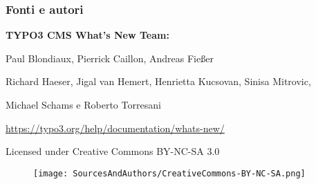 
\begin{frame}[fragile]
	\frametitle{Fonti e autori}

	\vspace{-0.6cm}

	\centerline{\textbf{TYPO3 CMS What's New Team:}}

	\begin{center}
		\centerline{Paul Blondiaux, Pierrick Caillon, Andreas Fießer}
		\centerline{Richard Haeser, Jigal van Hemert, Henrietta Kucsovan, Sinisa Mitrovic,}
		\centerline{Michael Schams e Roberto Torresani}
	\end{center}

	\vspace{0.6cm}

	\smaller\begin{center}\url{https://typo3.org/help/documentation/whats-new/}\end{center}\normalsize

	\vspace{1cm}

	\smaller\begin{center}Licensed under Creative Commons BY-NC-SA 3.0\end{center}\normalsize
	\begin{figure}\vspace*{-0.4cm}
		\texttt{[image: SourcesAndAuthors/CreativeCommons-BY-NC-SA.png]}
	\end{figure}

\end{frame}

